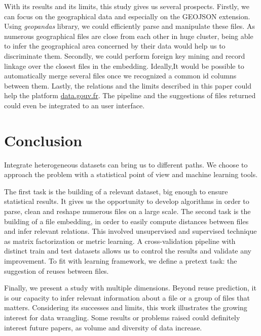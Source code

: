 \documentclass[a4paper]{article}
\begin{document}
	With its results and its limits, this study gives us several prospects. Firstly, we can focus on the geographical data and especially on the GEOJSON extension. Using \emph{geopandas} library, we could efficiently parse and manipulate these files. As numerous geographical files are close from each other in huge cluster, being able to infer the geographical area concerned by their data would help us to discriminate them. Secondly, we could perform foreign key mining and record linkage over the closest files in the embedding. Ideally,It would be possible to automatically merge several files once we recognized a common id columns between them. Lastly, the relations and the limits described in this paper could help the platform \href{http://www.data.gouv.fr/fr/}{data.gouv.fr}. The pipeline and the suggestions of files returned could even be integrated to an user interface. 

	\section{Conclusion}	
	
	Integrate heterogeneous datasets can bring us to different paths. We choose to approach the problem with a statistical point of view and machine learning tools. 
	
	The first task is the building of a relevant dataset, big enough to ensure statistical results. It gives us the opportunity to develop algorithms in order to parse, clean and reshape numerous files on a large scale. The second task is the building of a file embedding, in order to easily compute distances between files and infer relevant relations. This involved unsupervised and supervised technique as matrix factorization or metric learning. A cross-validation pipeline with distinct train and test datasets allows us to control the results and validate any improvement. To fit with learning framework, we define a pretext task: the suggestion of reuses between files. 
	
	Finally, we present a study with multiple dimensions. Beyond reuse prediction, it is our capacity to infer relevant information about a file or a group of files that matters. Considering its successes and limits, this work illustrates the growing interest for data wrangling. Some results or problems raised could definitely interest future papers, as volume and diversity of data increase. 
	
	
	
	
\end{document}
